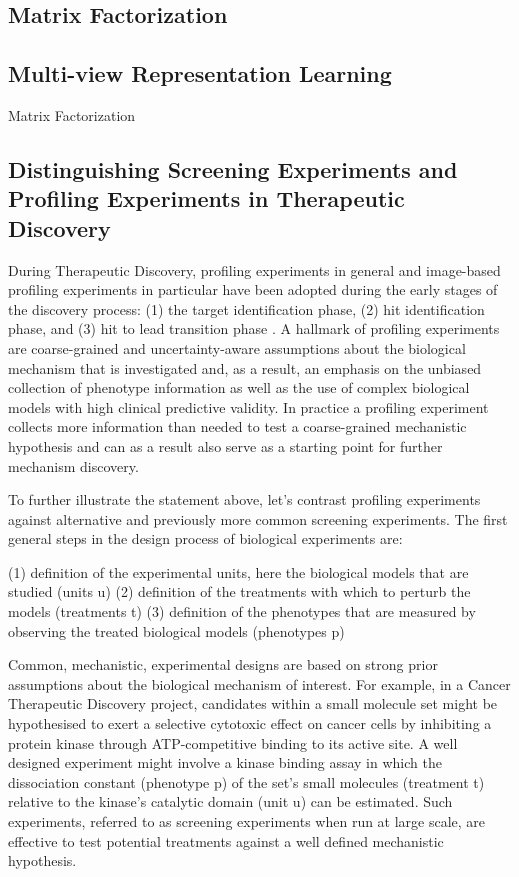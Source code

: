 \begin{flushleft}
\subsection{Matrix Factorization}

\subsection{Multi-view Representation Learning}

Matrix Factorization

\subsection{Distinguishing Screening Experiments and Profiling Experiments in Therapeutic Discovery}

During Therapeutic Discovery, profiling experiments in general and image-based profiling experiments in particular have been adopted during the early stages of the discovery process: (1) the target identification phase, (2) hit identification phase, and (3) hit to lead transition phase \cite{chandrasekaranImagebasedProfilingDrug2021}. A hallmark of profiling experiments are coarse-grained and uncertainty-aware assumptions about the biological mechanism that is investigated and, as a result, an emphasis on the unbiased collection of phenotype information as well as the use of complex biological models with high clinical predictive validity. In practice a profiling experiment collects more information than needed to test a coarse-grained mechanistic hypothesis and can as a result also serve as a starting point for further mechanism discovery. 

To further illustrate the statement above, let's contrast profiling experiments against alternative and previously more common screening experiments. The first general steps in the design process of biological experiments are:

(1) definition of the experimental units, here the biological models that are studied (units u)
(2) definition of the treatments with which to perturb the models (treatments t)
(3) definition of the phenotypes that are measured by observing the treated biological models (phenotypes p)

Common, mechanistic, experimental designs are based on strong prior assumptions about the biological mechanism of interest. For example, in a Cancer Therapeutic Discovery project, candidates within a small molecule set might be hypothesised to exert a selective cytotoxic effect on cancer cells by inhibiting a protein kinase through ATP-competitive binding to its active site. A well designed experiment might involve a kinase binding assay in which the dissociation constant (phenotype p) of the set's small molecules (treatment t) relative to the kinase's catalytic domain (unit u) can be estimated. Such experiments, referred to as screening experiments when run at large scale, are effective to test potential treatments against a well defined mechanistic hypothesis. 


\end{flushleft}
